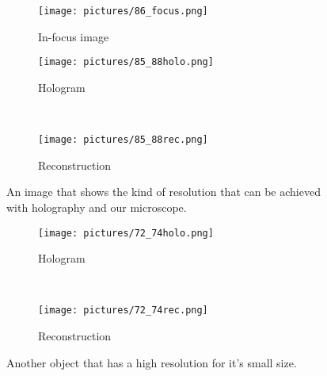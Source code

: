 \begin{figure}[ht!]
    \begin{center}

        \begin{subfigure}[t]{0.4\textwidth}
            \label{fig:86_focus}
            \texttt{[image: pictures/86\_focus.png]}
            \caption{In-focus image}
        \end{subfigure}
        \begin{subfigure}[t]{0.4\textwidth}
            \label{fig:85_88holo}
            \texttt{[image: pictures/85\_88holo.png]}
            \caption{Hologram}
        \end{subfigure}
        \\
        \begin{subfigure}[t]{\textwidth}
            \label{fig:85_88rec}
            \texttt{[image: pictures/85\_88rec.png]}
            \caption{Reconstruction}
        \end{subfigure}


    \end{center}
    \caption{%
        An image that shows the kind of resolution that can be achieved with
        holography and our microscope.
    }%
    \label{fig:85_88}
\end{figure}


\begin{figure}[ht!]
    \begin{center}

        \begin{subfigure}[t]{0.4\textwidth}
            \label{fig:72_74holo}
            \texttt{[image: pictures/72\_74holo.png]}
            \caption{Hologram}
        \end{subfigure}
        \\
        \begin{subfigure}[t]{\textwidth}
            \label{fig:72_74rec}
            \texttt{[image: pictures/72\_74rec.png]}
            \caption{Reconstruction}
        \end{subfigure}


    \end{center}
    \caption{%
        Another object that has a high resolution for it's small size.
    }%
    \label{fig:72_74}
\end{figure}


